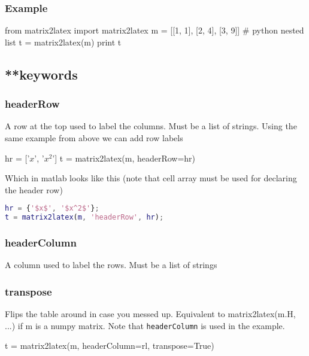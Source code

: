 \subsubsection{Example}
\begin{pygments}
  from matrix2latex import matrix2latex
  m = [[1, 1], [2, 4], [3, 9]] # python nested list
  t = matrix2latex(m)
  print t
\end{pygments}

\subsection{**keywords}
\subsubsection{headerRow}
A row at the top used to label the columns.
Must be a list of strings.
Using the same example from above we can add row labels
\begin{pygments}
hr = ['$x$', '$x^2$']
t = matrix2latex(m, headerRow=hr)
\end{pygments}

Which in matlab looks like this (note that cell array must be used for
declaring the header row)
\begin{lstlisting}[language=matlab, basicstyle=\small\rmfamily, stringstyle=\mdseries]
hr = {'$x$', '$x^2$'};
t = matrix2latex(m, 'headerRow', hr);
\end{lstlisting}

\subsubsection{headerColumn}
    A column used to label the rows.
    Must be a list of strings
\subsubsection{transpose}
Flips the table around in case you messed up. Equivalent to
matrix2latex(m.H, ...)
if m is a numpy matrix.
Note that \lstinline{headerColumn} is used in the example.
\begin{pygments}
t = matrix2latex(m, headerColumn=rl, transpose=True)
\end{pygments}

